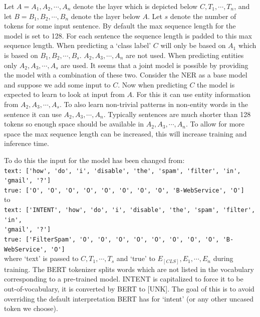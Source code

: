 Let $A = A_1, A_2, \cdots, A_n$ denote the layer which is depicted below $C, T_1, \cdots, T_n$, and let $B = B_1, B_2, \cdots, B_n$ denote the layer below $A$.
Let $s$ denote the number of tokens for some input sentence.
By default the max sequence length for the model is set to 128.
For each sentence the sequence length is padded to this max sequence length.
When predicting a `class label' $C$ will only be based on $A_1$ which is based on $B_1, B_2, \cdots, B_s$.
$A_2, A_3, \cdots, A_n$ are not used.
When predicting entities only $A_2, A_3, \cdots, A_s$ are used.
It seems that a joint model is possible by providing the model with a combination of these two.
Consider the NER as a base model and suppose we add some input to $C$.
Now when predicting $C$ the model is expected to learn to look at input from $A$.
For this it can use entity information from $A_2, A_3, \cdots, A_s$.
To also learn non-trivial patterns in non-entity words in the sentence it can use $A_2, A_3, \cdots, A_n$.
Typically sentences are much shorter than 128 tokens so enough space should be available in $A_2, A_3, \cdots, A_n$.
To allow for more space the max sequence length can be increased, this will increase training and inference time.

To do this the input for the model has been changed from: \\

\noindent \verb|text: ['how', 'do', 'i', 'disable', 'the', 'spam', 'filter', 'in', 'gmail', '?']|\\
\verb|true: ['O', 'O', 'O', 'O', 'O', 'O', 'O', 'O', 'B-WebService', 'O']|\\

to\\

\noindent \verb|text: ['INTENT', 'how', 'do', 'i', 'disable', 'the', 'spam', 'filter', 'in',|\\
\hspace*{12cm} \verb|'gmail', '?']|\\
\verb|true: ['FilterSpam', 'O', 'O', 'O', 'O', 'O', 'O', 'O', 'O', 'B-WebService', 'O']|\\

where `text' is passed to $C, T_1, \cdots, T_s$ and `true' to $E_{[CLS]}, E_1, \cdots, E_n$ during training.
The BERT tokenizer splits words which are not listed in the vocabulary corresponding to a pre-trained model.
INTENT is capitalized to force it to be out-of-vocabulary, it is converted by BERT to [UNK].
The goal of this is to avoid overriding the default interpretation BERT has for `intent' (or any other uncased token we choose).

